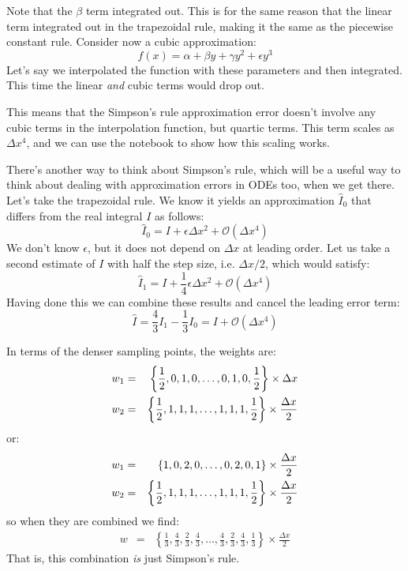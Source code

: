 Note that the $\beta$ term integrated out. This is for the same reason
that the linear term integrated out in the trapezoidal rule, making it
the same as the piecewise constant rule. Consider now a cubic
approximation:
\begin{equation}
  f(x) = \alpha + \beta y + \gamma y^2 + \epsilon y^3
\end{equation}
Let's say we interpolated the function with these parameters and then
integrated. This time the linear {\it and} cubic terms would drop out.

This means that the Simpson's rule approximation error doesn't involve
any cubic terms in the interpolation function, but quartic terms. This
term scales as $\Delta x^4$, and we can use the notebook to show how
this scaling works.

There's another way to think about Simpson's rule, which will be a
useful way to think about dealing with approximation errors in ODEs
too, when we get there. Let's take the trapezoidal rule. We know it
yields an approximation $\hat I_0$ that differs from the real integral
$I$ as follows:
\begin{equation}
\hat I_0 = I + \epsilon \Delta x^2 + \mathcal{O}\left(\Delta x^4\right)
\end{equation}
We don't know $\epsilon$, but it does not depend on $\Delta x$ at
leading order. Let us take a second estimate of $I$ with half the step
size, i.e. $\Delta x /2$, which would satisfy: 
\begin{equation}
\hat I_1 = I + \frac{1}{4} \epsilon \Delta x^2 + \mathcal{O}\left(\Delta x^4\right)
\end{equation}
Having done this we can combine these results and cancel the leading error
term:
\begin{equation}
\hat I = \frac{4}{3} I_1 - \frac{1}{3} I_0 = I + \mathcal{O}\left(\Delta x^4\right)
\end{equation}

In terms of the denser sampling points, the weights are:
\begin{eqnarray}
w_1 &=& \left\{\frac{1}{2}, 0, 1, 0, \ldots, 0, 1,
0, \frac{1}{2}\right\} \times \Delta x\cr
w_2 &=& \left\{\frac{1}{2}, 1, 1, 1, \ldots, 1, 1,
1, \frac{1}{2}\right\} \times \frac{\Delta x}{2}
\end{eqnarray}
or:
\begin{eqnarray}
w_1 &=& \left\{1, 0, 2, 0, \ldots, 0, 2,
0, 1\right\} \times \frac{\Delta x}{2}\cr
w_2 &=& \left\{\frac{1}{2}, 1, 1, 1, \ldots, 1, 1,
1, \frac{1}{2}\right\} \times \frac{\Delta x}{2}
\end{eqnarray}
so when they are combined we find:
\begin{eqnarray}
w &=& \left\{\frac{1}{3}, \frac{4}{3}, \frac{2}{3}, \frac{4}{3},
\ldots, \frac{4}{3}, \frac{2}{3}, \frac{4}{3}, \frac{1}{3}\right\}  \times \frac{\Delta x}{2}
\end{eqnarray}
That is, this combination {\it is} just Simpson's rule.

